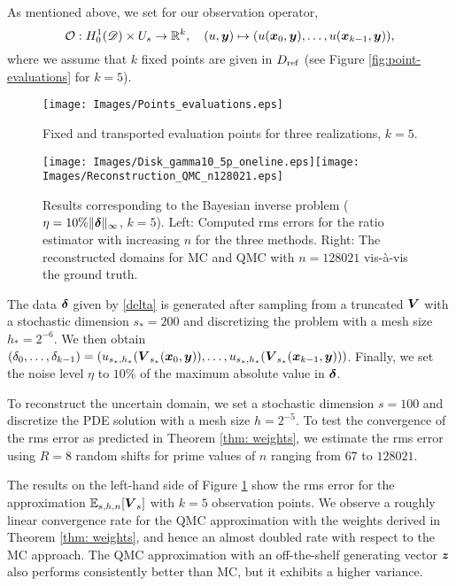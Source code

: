 \documentclass[graybox]{svmult}
\begin{document}
As mentioned above, we set for our observation operator, 
$$
\mathcal{O}: H_0^1(\mathscr D) \times U_s \to \mathbb{R}^k, \quad (u,{\boldsymbol{y}}) \mapsto (u({\boldsymbol{x}}_0, {\boldsymbol{y}}), \dots, u({\boldsymbol{x}}_{k-1}, {\boldsymbol{y}})),
$$
where we assume that $k$ fixed points are given in $D_{\rm ref}$ (see Figure \ref{fig:point-evaluations} for $k = 5$).

\begin{figure}[!t]
    \centering
    \texttt{[image: Images/Points\_evaluations.eps]}
    \caption{Fixed and transported evaluation points for three realizations, $k=5$.}
    \label{fig:point-evaluations}
        \centering
    \texttt{[image: Images/Disk\_gamma10\_5p\_oneline.eps]}\texttt{[image: Images/Reconstruction\_QMC\_n128021.eps]}
    \caption{Results corresponding to the Bayesian inverse problem ($\eta = 10\% \| {\boldsymbol{\delta}} \|_{\infty}$, $k=5$). Left: Computed rms errors for the ratio estimator with increasing $n$ for the three methods. Right: The reconstructed domains for MC and QMC with $n=128021$ vis-\`a-vis the ground truth.}
    \label{fig:rms convergence}
\end{figure}

The data ${\boldsymbol{\delta}}$ given by \eqref{delta} is generated after sampling from a truncated ${\boldsymbol{V}}$ with a stochastic dimension $s_* = 200$ and discretizing the problem with a mesh size $h_* = 2^{-6}$. We then obtain $(\delta_0, \dots, \delta_{k-1}) = (u_{s_*,h_*}({\boldsymbol{V}}_{s_*}({\boldsymbol{x}}_0, {\boldsymbol{y}})), \dots, u_{s_*,h_*}({\boldsymbol{V}}_{s_*}({\boldsymbol{x}}_{k-1}, {\boldsymbol{y}})))$. Finally, we set the noise level $\eta$ to $10\%$ of the maximum absolute value in ${\boldsymbol{\delta}}$.

To reconstruct the uncertain domain, we set a stochastic dimension $s = 100$ and discretize the PDE solution with a mesh size $h = 2^{-5}$. To test the convergence of the rms error as predicted in Theorem \ref{thm: weights}, we estimate the rms error using $R=8$ random shifts for prime values of $n$ ranging from $67$ to $128021$. 


The results on the left-hand side of Figure \ref{fig:rms convergence} show the rms error for the approximation $\mathbb{E}_{s,h,n}[{\boldsymbol{V}}_s]$ with $k = 5$ observation points. We observe a roughly linear convergence rate for the QMC approximation with the weights derived in Theorem \ref{thm: weights}, and hence an almost doubled rate with respect to the MC approach. The QMC approximation with an off-the-shelf generating vector ${\boldsymbol{z}}$ also performs consistently better than MC, but it exhibits a higher variance.
\end{document}
